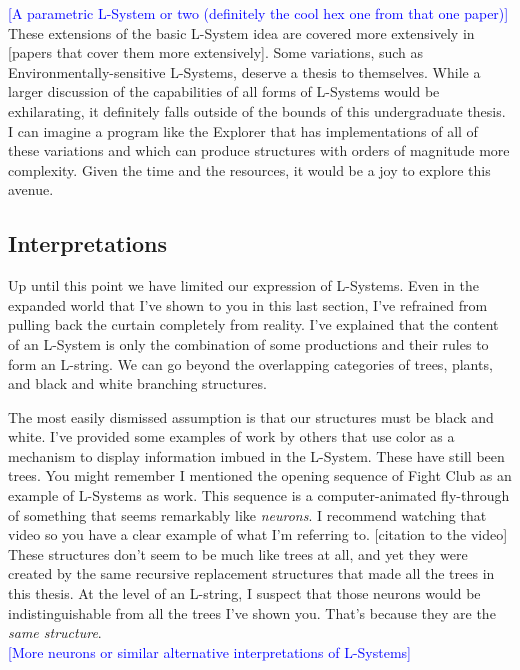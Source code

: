 \documentclass[12pt,twoside]{reedthesis}
\begin{document}
	\textcolor{blue}{[A parametric L-System or two (definitely the cool hex one from that one paper)]}\\
	
	These extensions of the basic L-System idea are covered more extensively in [papers that cover them more extensively]. Some variations, such as Environmentally-sensitive L-Systems, deserve a thesis to themselves. While a larger discussion of the capabilities of all forms of L-Systems would be exhilarating, it definitely falls outside of the bounds of this undergraduate thesis. I can imagine a program like the Explorer that has implementations of all of these variations and which can produce structures with orders of magnitude more complexity. Given the time and the resources, it would be a joy to explore this avenue.
	
	\subsection{Interpretations}
	Up until this point we have limited our expression of L-Systems. Even in the expanded world that I've shown to you in this last section, I've refrained from pulling back the curtain completely from reality. I've explained that the content of an L-System is only the combination of some productions and their rules to form an L-string. We can go beyond the overlapping categories of trees, plants, and black and white branching structures.
	
	The most easily dismissed assumption is that our structures must be black and white. I've provided some examples of work by others that use color as a mechanism to display information imbued in the L-System. These have still been trees. You might remember I mentioned the opening sequence of Fight Club as an example of L-Systems as work. This sequence is a computer-animated fly-through of something that seems remarkably like \textit{neurons}. I recommend watching that video so you have a clear example of what I'm referring to. [citation to the video] These structures don't seem to be much like trees at all, and yet they were created by the same recursive replacement structures that made all the trees in this thesis. At the level of an L-string, I suspect that those neurons would be indistinguishable from all the trees I've shown you. That's because they are the \textit{same structure}.\\
	
	\textcolor{blue}{[More neurons or similar alternative interpretations of L-Systems]}\\
	
\end{document}
